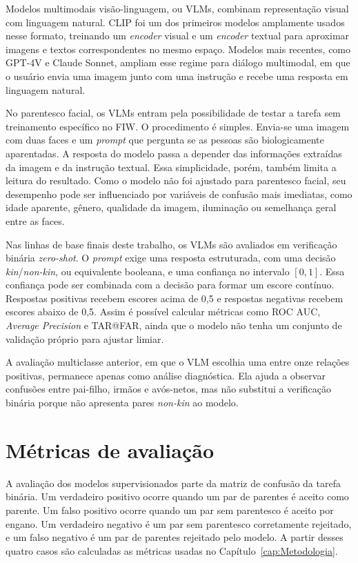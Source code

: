 Modelos multimodais visão-linguagem, ou VLMs, combinam representação visual com linguagem natural. CLIP \cite{radford2021learning} foi um dos primeiros modelos amplamente usados nesse formato, treinando um \textit{encoder} visual e um \textit{encoder} textual para aproximar imagens e textos correspondentes no mesmo espaço. Modelos mais recentes, como GPT-4V e Claude Sonnet, ampliam esse regime para diálogo multimodal, em que o usuário envia uma imagem junto com uma instrução e recebe uma resposta em linguagem natural.

No parentesco facial, os VLMs entram pela possibilidade de testar a tarefa sem treinamento específico no FIW. O procedimento é simples. Envia-se uma imagem com duas faces e um \textit{prompt} que pergunta se as pessoas são biologicamente aparentadas. A resposta do modelo passa a depender das informações extraídas da imagem e da instrução textual. Essa simplicidade, porém, também limita a leitura do resultado. Como o modelo não foi ajustado para parentesco facial, seu desempenho pode ser influenciado por variáveis de confusão mais imediatas, como idade aparente, gênero, qualidade da imagem, iluminação ou semelhança geral entre as faces.

Nas linhas de base finais deste trabalho, os VLMs são avaliados em verificação binária \textit{zero-shot}. O \textit{prompt} exige uma resposta estruturada, com uma decisão \textit{kin}/\textit{non-kin}, ou equivalente booleana, e uma confiança no intervalo $[0,1]$. Essa confiança pode ser combinada com a decisão para formar um escore contínuo. Respostas positivas recebem escores acima de 0,5 e respostas negativas recebem escores abaixo de 0,5. Assim é possível calcular métricas como ROC AUC, \textit{Average Precision} e TAR@FAR, ainda que o modelo não tenha um conjunto de validação próprio para ajustar limiar.

A avaliação multiclasse anterior, em que o VLM escolhia uma entre onze relações positivas, permanece apenas como análise diagnóstica. Ela ajuda a observar confusões entre pai-filho, irmãos e avós-netos, mas não substitui a verificação binária porque não apresenta pares \textit{non-kin} ao modelo.

\section{Métricas de avaliação}

A avaliação dos modelos supervisionados parte da matriz de confusão da tarefa binária. Um verdadeiro positivo ocorre quando um par de parentes é aceito como parente. Um falso positivo ocorre quando um par sem parentesco é aceito por engano. Um verdadeiro negativo é um par sem parentesco corretamente rejeitado, e um falso negativo é um par de parentes rejeitado pelo modelo. A partir desses quatro casos são calculadas as métricas usadas no Capítulo~\ref{cap:Metodologia}.

